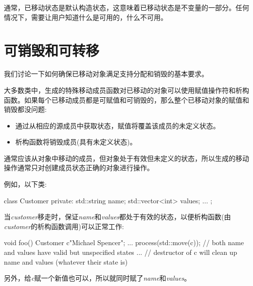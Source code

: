 通常，已移动状态是默认构造状态，这意味着已移动状态是不变量的一部分。任何情况下，需要让用户知道什么是可用的，什么不可用。\par


\section{可销毁和可转移}

我们讨论一下如何确保已移动对象满足支持分配和销毁的基本要求。\par


大多数类中，生成的特殊移动成员函数对已移动的对象可以使用赋值操作符和析构函数。如果每个已移动成员都是可赋值和可销毁的，那么整个已移动对象的赋值和销毁都没问题:\par

\begin{itemize}
  \item 通过从相应的源成员中获取状态，赋值将覆盖该成员的未定义状态。
  \item 析构函数将销毁成员(具有未定义状态)。
\end{itemize}

通常应该从对象中移动的成员，但对象处于有效但未定义的状态，所以生成的移动操作通常只对创建成员状态正确的对象进行操作。\par

例如，以下类:\par

\begin{codebox}[cpp]
class Customer {
private:
  std::string name;
  std::vector<int> values;
  ...
};
\end{codebox}

当\textit{customer}移走时，保证\textit{name}和\textit{values}都处于有效的状态，以便析构函数(由\textit{customer}的析构函数调用)可以正常工作:\par

\begin{codebox}[cpp]
void foo()
{
  Customer c{"Michael Spencer"};
  ...
  process(std::move(c));
  // both name and values have valid but unspecified states
  ...
} // destructor of c will clean up name and values (whatever their state is)
\end{codebox}

另外，给\textit{c}赋一个新值也可以，所以就同时赋了\textit{name}和\textit{values}。\par


